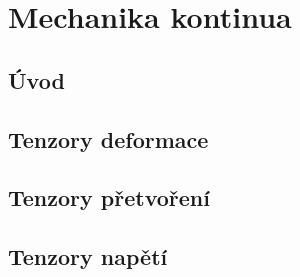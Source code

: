 \chapter{Mechanika kontinua}
\section{Úvod}




\section{Tenzory deformace}



\section{Tenzory přetvoření}






\section{Tenzory napětí}





%
